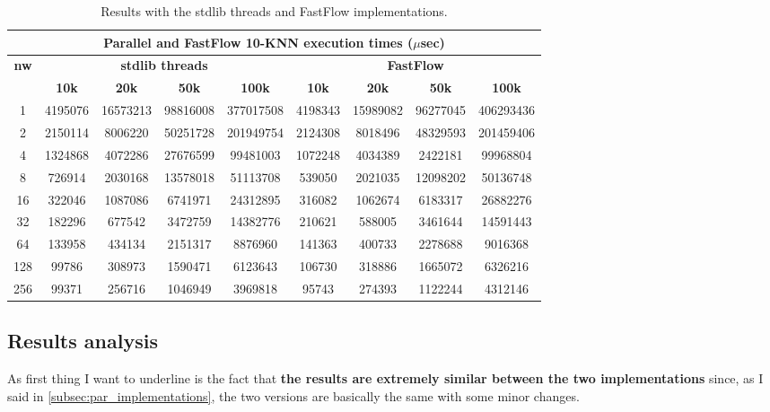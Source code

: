 \begin{table}[H]
\centering
\begin{tabular}{c||c|c|c|c||c|c|c|c}\hline \hline
\multicolumn{9}{c}{\textbf{Parallel and FastFlow 10-KNN execution times ($\mu$sec)}} \\\hline \hline
\multirow{2}{*}{\textbf{nw}} & \multicolumn{4}{c||}{\textbf{stdlib threads}} & \multicolumn{4}{c}{\textbf{FastFlow}} \\\cline{2-9}
& \textbf{10k} & \textbf{20k} & \textbf{50k} & \textbf{100k} & \textbf{10k} & \textbf{20k} & \textbf{50k} & \textbf{100k} \\\hline
1 & 4195076 & 16573213 & 98816008 & 377017508 & 4198343 & 15989082 & 96277045 & 406293436 \\
2 & 2150114 & 8006220 & 50251728 & 201949754 & 2124308 & 8018496 & 48329593 & 201459406 \\
4 & 1324868 & 4072286 & 27676599 & 99481003 & 1072248 & 4034389 & 2422181 & 99968804 \\
8 & 726914 & 2030168 & 13578018 & 51113708 & 539050 & 2021035 & 12098202 & 50136748 \\
16 & 322046 & 1087086 & 6741971 & 24312895 & 316082 & 1062674 & 6183317 & 26882276 \\
32 & 182296 & 677542 & 3472759 & 14382776 & 210621 & 588005 & 3461644 & 14591443 \\
64 & 133958 & 434134 & 2151317 & 8876960 & 141363 & 400733 & 2278688 & 9016368 \\
128 & 99786 & 308973 & 1590471 & 6123643 & 106730 & 318886 & 1665072 & 6326216 \\
256 & 99371 & 256716 & 1046949 & 3969818 & 95743 & 274393 & 1122244 & 4312146 \\ \hline \hline
\end{tabular}
\caption{Results with the stdlib threads and FastFlow implementations.}
\label{table:knn_parallel_fastflow_results}
\end{table}

\subsection{Results analysis}
As first thing I want to underline is the fact that \textbf{the results are extremely similar between the two implementations} since, as I said in \autoref{subsec:par_implementations}, the two versions are basically the same with some minor changes.

